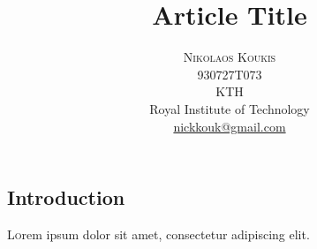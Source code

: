 \documentclass[twoside]{article}
\title{\vspace{-15mm}\fontsize{24pt}{10pt}\selectfont\textbf{Article Title}} %
\author{
\large
\textsc{Nikolaos Koukis}\\%
\normalsize 930727T073\\
\normalsize KTH\\
\normalsize Royal Institute of Technology \\ %
\normalsize \href{mailto:nickkouk@sgmail.com}{nickkouk@gmail.com}
\vspace{-5mm}
}
\date{}
\begin{document}
\maketitle %

\thispagestyle{fancy} %


\begin{abstract}

\noindent \lipsum[1] %

\end{abstract}


\begin{multicols}{2} %

\section{Introduction}

\lettrine[nindent=0em,lines=3]{L} orem ipsum dolor sit amet, consectetur adipiscing elit.


\end{multicols}
\end{document}
